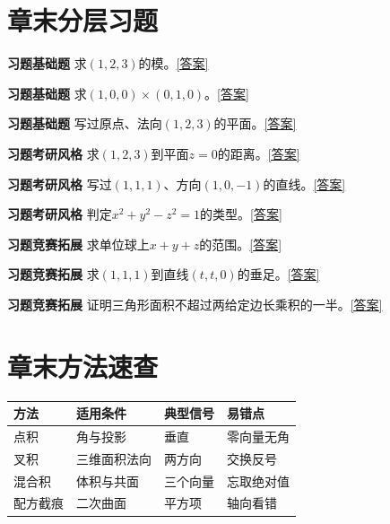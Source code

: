 \section*{章末分层习题}
\label{q:5:1}\par\noindent\textbf{习题\theexercise\quad 基础题} 求$(1,2,3)$的模。\quad\hyperref[a:5:1]{[答案]}\par
{}\label{q:5:2}\par\noindent\textbf{习题\theexercise\quad 基础题} 求$(1,0,0)\times(0,1,0)$。\quad\hyperref[a:5:2]{[答案]}\par
{}\label{q:5:3}\par\noindent\textbf{习题\theexercise\quad 基础题} 写过原点、法向$(1,2,3)$的平面。\quad\hyperref[a:5:3]{[答案]}\par
{}\label{q:5:4}\par\noindent\textbf{习题\theexercise\quad 考研风格} 求$(1,2,3)$到平面$z=0$的距离。\quad\hyperref[a:5:4]{[答案]}\par
{}\label{q:5:5}\par\noindent\textbf{习题\theexercise\quad 考研风格} 写过$(1,1,1)$、方向$(1,0,-1)$的直线。\quad\hyperref[a:5:5]{[答案]}\par
{}\label{q:5:6}\par\noindent\textbf{习题\theexercise\quad 考研风格} 判定$x^2+y^2-z^2=1$的类型。\quad\hyperref[a:5:6]{[答案]}\par
{}\label{q:5:7}\par\noindent\textbf{习题\theexercise\quad 竞赛拓展} 求单位球上$x+y+z$的范围。\quad\hyperref[a:5:7]{[答案]}\par
{}\label{q:5:8}\par\noindent\textbf{习题\theexercise\quad 竞赛拓展} 求$(1,1,1)$到直线$(t,t,0)$的垂足。\quad\hyperref[a:5:8]{[答案]}\par
{}\label{q:5:9}\par\noindent\textbf{习题\theexercise\quad 竞赛拓展} 证明三角形面积不超过两给定边长乘积的一半。\quad\hyperref[a:5:9]{[答案]}\par
\section*{章末方法速查}
\par\noindent\begin{tabularx}{\textwidth}{p{23mm}XXX}\toprule 方法&适用条件&典型信号&易错点\\\midrule
点积&角与投影&垂直&零向量无角\\叉积&三维面积法向&两方向&交换反号\\混合积&体积与共面&三个向量&忘取绝对值\\配方截痕&二次曲面&平方项&轴向看错\\
\bottomrule\end{tabularx}
